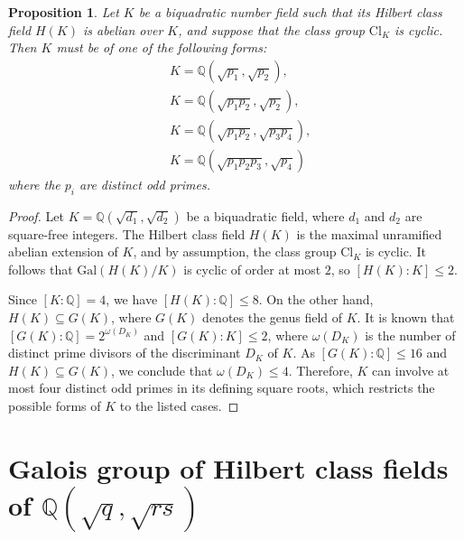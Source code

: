 \documentclass[12 pt]{amsart}
\newtheorem{prop}[thm]{Proposition}
\theoremstyle{definition}
\theoremstyle{remark}
\begin{document}
    \begin{prop}\label{structure:biquadratic}
Let $K$ be a biquadratic number field such that its Hilbert class field $H(K)$ is abelian over $K$, and suppose that the class group $\mathrm{Cl}_K$ is cyclic. Then $K$ must be of one of the following forms:
\begin{equation}\label{classicification:biquadratic}
\begin{aligned}
  & K = \mathbb{Q}\left(\sqrt{p_1}, \sqrt{p_2}\right), \\
  & K = \mathbb{Q}\left(\sqrt{p_1p_2}, \sqrt{p_2}\right), \\
  & K = \mathbb{Q}\left(\sqrt{p_1p_2}, \sqrt{p_3p_4}\right), \\
  & K = \mathbb{Q}\left(\sqrt{p_1p_2p_3}, \sqrt{p_4}\right)
\end{aligned}
\end{equation}
where the $p_i$ are distinct odd primes.
\end{prop}

\begin{proof}
Let $K = \mathbb{Q}(\sqrt{d_1}, \sqrt{d_2})$ be a biquadratic field, where $d_1$ and $d_2$ are square-free integers. The Hilbert class field $H(K)$ is the maximal unramified abelian extension of $K$, and by assumption, the class group $\mathrm{Cl}_K$ is cyclic. It follows that $\mathrm{Gal}(H(K)/K)$ is cyclic of order at most $2$, so $[H(K):K] \leq 2$.

Since $[K:\mathbb{Q}] = 4$, we have $[H(K):\mathbb{Q}] \leq 8$. On the other hand, $H(K) \subseteq G(K)$, where $G(K)$ denotes the genus field of $K$. It is known that $[G(K):\mathbb{Q}] = 2^{\omega(D_K)}$ and $[G(K):K]\leq 2$, where $\omega(D_K)$ is the number of distinct prime divisors of the discriminant $D_K$ of $K$.
As $[G(K):\mathbb{Q}] \leq 16$ and $H(K) \subseteq G(K)$, we conclude that $\omega(D_K) \leq 4$. Therefore, $K$ can involve at most four distinct odd primes in its defining square roots, which restricts the possible forms of $K$ to the listed cases.
\end{proof}

\section[Galois group of Hilbert class fields of Q(sqrt{q}, sqrt{rs})]{Galois group of Hilbert class fields of $\mathbb{Q}(\sqrt{q}, \sqrt{rs})$}\label{sec:structure}
\end{document}
